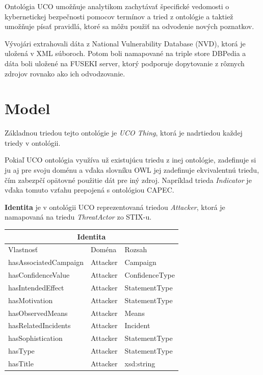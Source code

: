 \documentclass[12pt, a4paper, oneside]{book}
\begin{document}
Ontológia UCO umožňuje analytikom zachytávať špecifické vedomosti o kybernetickej bezpečnosti pomocov termínov a tried z ontológie a taktiež umožňuje písať pravidlá, ktoré sa môžu použiť na odvodenie nových poznatkov.


Vývojári extrahovali dáta z National Vulnerability Database (NVD), ktorá je uložená v XML súboroch. Potom boli namapované na triple store DBPedia a dáta boli uložené na FUSEKI server, ktorý podporuje dopytovanie z rôznych zdrojov rovnako ako ich odvodzovanie.


\section{Model}
Základnou triedou tejto ontológie je \textit{UCO Thing}, ktorá je nadrtiedou každej triedy v ontológii.


Pokiaľ UCO ontológia využíva už existujúcu triedu z inej ontológie, zadefinuje si ju aj pre svoju doménu a vďaka slovníku OWL jej zadefinuje ekvivalentnú triedu, čím zabezpčí opätovné použitie dát pre iný zdroj. Napríklad trieda \textit{Indicator} je vďaka tomuto vzťahu prepojená s ontológiou CAPEC.


\textbf{Identita} je v ontológii UCO reprezentovaná triedou \textit{Attacker}, ktorá je namapovaná na triedu \textit{ThreatActor} zo STIX-u.\\
\begin{tabular}{ |p{6cm}||p{3cm}|p{3cm}|  }
 \hline
 \multicolumn{3}{|c|}{Identita} \\
 \hline
 Vlastnosť & Doména & Rozsah\\
 \hline
 hasAssociatedCampaign & Attacker & Campaign\\
 hasConfidenceValue & Attacker & ConfidenceType\\
 hasIntendedEffect & Attacker & StatementType\\
 hasMotivation & Attacker & StatementType\\
 hasObservedMeans & Attacker & Means\\
 hasRelatedIncidents & Attacker & Incident\\
 hasSophistication & Attacker & StatementType\\
 hasType & Attacker & StatementType\\
 hasTitle & Attacker & xsd:string\\
 \hline
\end{tabular}\\
\end{document}

